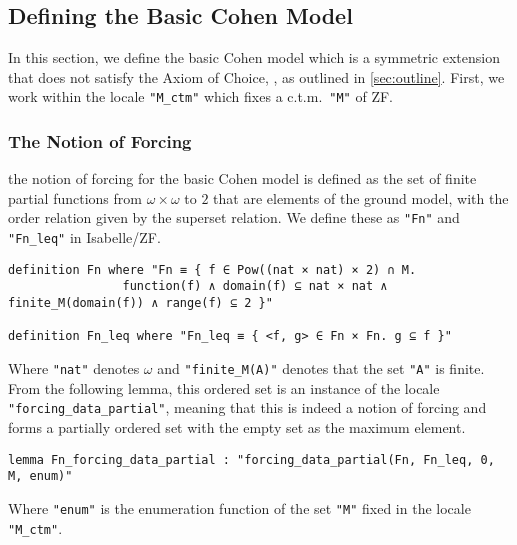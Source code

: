 \documentclass{report}
\newenvironment{isaframe}{\begin{mdframed}[topline=false, rightline=false, bottomline=false]}{\end{mdframed}}
\begin{document}
\subsection{Defining the Basic Cohen Model}
In this section, we define the basic Cohen model which is a symmetric extension that does not satisfy the Axiom of Choice,
, as outlined in \cref{sec:outline}.
First, we work within the locale \texttt{"M\_ctm"} which fixes a c.t.m.\  \texttt{"M"} of ZF.


\subsubsection{The Notion of Forcing}
the notion of forcing for the basic Cohen model is defined as the set of finite partial functions from $\omega \times \omega$ to $2$ that are elements of the ground model,
with the order relation given by the superset relation.
We define these as \texttt{"Fn"} and \texttt{"Fn\_leq"} in Isabelle/ZF.

\begin{isaframe}
\begin{verbatim}
definition Fn where "Fn ≡ { f ∈ Pow((nat × nat) × 2) ∩ M. 
                function(f) ∧ domain(f) ⊆ nat × nat ∧ finite_M(domain(f)) ∧ range(f) ⊆ 2 }"

definition Fn_leq where "Fn_leq ≡ { <f, g> ∈ Fn × Fn. g ⊆ f }" 
\end{verbatim}
\end{isaframe}
Where \texttt{"nat"} denotes $\omega$ and \texttt{"finite\_M(A)"} denotes that the set \texttt{"A"} is finite.
From the following lemma, this ordered set is an instance of the locale \texttt{"forcing\_data\_partial"}, 
meaning that this is indeed a notion of forcing and forms a partially ordered set with the empty set as the maximum element.
\begin{isaframe}
\begin{verbatim}
lemma Fn_forcing_data_partial : "forcing_data_partial(Fn, Fn_leq, 0, M, enum)" 
\end{verbatim}
\end{isaframe}
Where \texttt{"enum"} is the enumeration function of the set \texttt{"M"} fixed in the locale \texttt{"M\_ctm"}.
\end{document}
